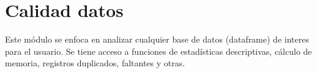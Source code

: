 \documentclass[letterpaper,10pt,openany,spanish]{sphinxmanual}
\begin{document}
\chapter{Calidad datos}
\label{\detokenize{calidad_datos:calidad-datos}}\label{\detokenize{calidad_datos:id1}}\label{\detokenize{calidad_datos::doc}}
Este módulo se enfoca en analizar cualquier base de datos (dataframe) de interes para el usuario. Se tiene acceso a funciones de estadísticas descriptivas, cálculo de memoria, registros duplicados, faltantes y otras.

\label{\detokenize{calidad_datos:module-calidad_datos}}
\end{document}
